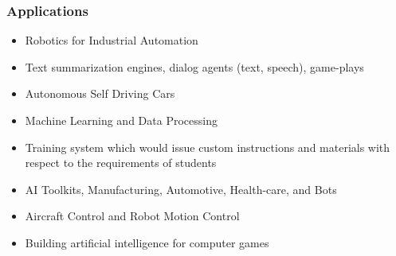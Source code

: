 \begin{frame}[fragile]\frametitle{Applications}

\begin{itemize}
\item Robotics for Industrial Automation
\item Text summarization engines, dialog agents (text, speech), game-plays
\item Autonomous Self Driving Cars
\item Machine Learning and Data Processing
\item Training system which would issue custom instructions and materials with respect to the requirements of students
\item AI Toolkits, Manufacturing, Automotive, Health-care, and Bots
\item Aircraft Control and Robot Motion Control
\item Building artificial intelligence for computer games
\end{itemize}

\end{frame}

